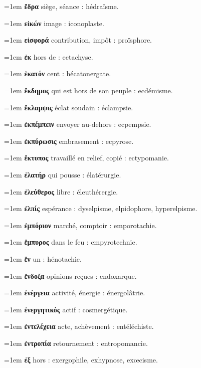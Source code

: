 \hangindent=1em \textbf{ἕδρα} siège, séance : hédraïsme.\par
\hangindent=1em \textbf{εἰκών} image : iconoplaste.\par
\hangindent=1em \textbf{εἰσφορά} contribution, impôt : proïsphore.\par
\hangindent=1em \textbf{ἐκ} hors de : ectachyse.\par
\hangindent=1em \textbf{ἑκατόν} cent : hécatonergate.\par
\hangindent=1em \textbf{ἔκδημος} qui est hors de son peuple : ecdémisme.\par
\hangindent=1em \textbf{ἔκλαμψις} éclat soudain : éclampsie.\par
\hangindent=1em \textbf{ἐκπέμπειν} envoyer au-dehors : ecpempsie.\par
\hangindent=1em \textbf{ἐκπύρωσις} embrasement : ecpyrose.\par
\hangindent=1em \textbf{ἔκτυπος} travaillé en relief, copié : ectypomanie.\par
\hangindent=1em \textbf{ἐλατήρ} qui pousse : élatérurgie.\par
\hangindent=1em \textbf{ἐλεύθερος} libre : éleuthérergie.\par
\hangindent=1em \textbf{ἐλπίς} espérance : dyselpisme, elpidophore, hyperelpisme.\par
\hangindent=1em \textbf{ἐμπόριον} marché, comptoir : emporotachie.\par
\hangindent=1em \textbf{ἔμπυρος} dans le feu : empyrotechnie.\par
\hangindent=1em \textbf{ἕν} un : hénotachie.\par
\hangindent=1em \textbf{ἔνδοξα} opinions reçues : endoxarque.\par
\hangindent=1em \textbf{ἐνέργεια} activité, énergie : énergolâtrie.\par
\hangindent=1em \textbf{ἐνεργητικός} actif : cosmergétique.\par
\hangindent=1em \textbf{ἐντελέχεια} acte, achèvement : entéléchiste.\par
\hangindent=1em \textbf{ἐντροπία} retournement : entropomancie.\par
\hangindent=1em \textbf{ἐξ} hors : exergophile, exhypnose, exœcisme.\par
